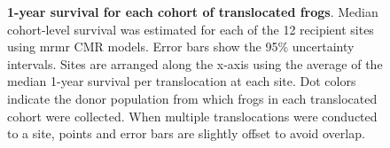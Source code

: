 \documentclass[
  letterpaper,
  DIV=11,
  numbers=noendperiod]{scrartcl}
\begin{document}
\begin{figure}


\caption{\label{fig-translocation-survival}\textbf{1-year survival for
each cohort of translocated frogs}. Median cohort-level survival was
estimated for each of the 12 recipient sites using mrmr CMR models.
Error bars show the 95\% uncertainty intervals. Sites are arranged along
the x-axis using the average of the median 1-year survival per
translocation at each site. Dot colors indicate the donor population
from which frogs in each translocated cohort were collected. When
multiple translocations were conducted to a site, points and error bars
are slightly offset to avoid overlap.}

\end{figure}%

\newpage
\end{document}
